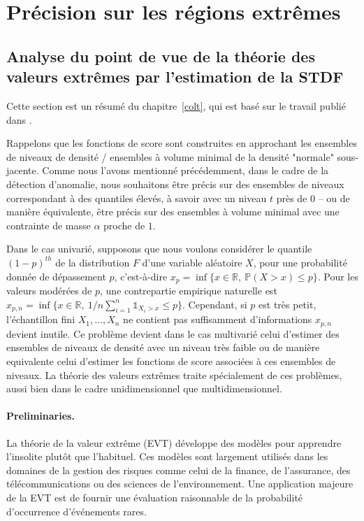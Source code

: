 \section{Précision sur les régions extrêmes}
\label{resume_fr:extreme}
\subsection{Analyse du point de vue de la théorie des valeurs extrêmes par l'estimation de la STDF}
\label{resume_fr:stdf}
Cette section est un résumé du chapitre~\ref{colt}, qui est basé sur le travail publié dans \cite{COLT15}.

Rappelons que les fonctions de score sont construites en approchant les ensembles de niveaux de densité / ensembles à volume minimal de la densité "normale" sous-jacente. Comme nous l'avons mentionné précédemment, dans le cadre de la détection d'anomalie, nous souhaitons être précis sur des ensembles de niveaux correspondant à des quantiles élevés, à savoir avec un niveau $ t $ près de $ 0 $ -- ou de manière équivalente, être précis sur des ensembles à volume minimal avec une contrainte de masse $ \alpha $ proche de $ 1 $.

%
Dans le cas univarié, supposons que nous voulons considérer le quantile $ (1-p) ^ {th} $ de la distribution $ F $ d'une variable aléatoire $ X $, pour une probabilité donnée de dépassement $ p $, c'est-à-dire
 $x_p = \inf\{x \in \mathbb{R},~ \mathbb{P}(X > x) \le p\}$. 
Pour les valeurs modérées de $ p $, une contrepartie empirique naturelle est
 $x_{p,n} = \inf\{x \in \mathbb{R},~ 1/n \sum_{i=1}^n \mathds{1}_{X_i > x}\le p\}$.
Cependant, si $ p $ est très petit, l'échantillon fini $ X_1, \ldots, X_n $ ne contient pas suffisamment d'informations $ x_ {p, n} $ devient inutile.
%
Ce problème devient dans le cas multivarié celui d'estimer des ensembles de niveaux de densité avec un niveau très faible ou de manière equivalente celui d'estimer les fonctions de score associées à ces ensembles de niveaux.
%
La théorie des valeurs extrêmes traite spécialement de ces problèmes, aussi bien dans le cadre unidimensionnel que multidimensionnel.
%


\paragraph{Preliminaries.}
La théorie de la valeur extrême (\textsc {EVT}) développe des modèles pour apprendre l'insolite plutôt que l'habituel. Ces modèles sont largement utilisés dans les domaines de la gestion des risques comme celui de la finance, de l'assurance, des télécommunications ou des sciences de l'environnement. Une application majeure de la \textsc{EVT} est de fournir une évaluation raisonnable de la probabilité d'occurrence d'événements rares.

